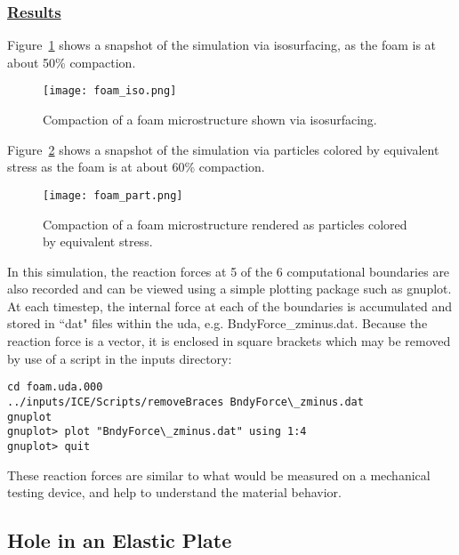 \subsubsection*{\underline{Results}}

Figure~\ref{figfoam} shows a snapshot of the simulation via isosurfacing,
as the foam is at about 50\% compaction.
\begin{figure}
  \center
  \texttt{[image: foam\_iso.png]}
  \caption{Compaction of a foam microstructure shown via isosurfacing.}
  \label{figfoam}
\end{figure}

Figure~\ref{figfoampart} shows a snapshot of the simulation via particles
colored by equivalent stress as the foam is at about 60\% compaction.
\begin{figure}
  \center
  \texttt{[image: foam\_part.png]}
  \caption{Compaction of a foam microstructure rendered as particles colored
           by equivalent stress.}
  \label{figfoampart}
\end{figure}

In this simulation, the reaction forces at 5 of the 6 computational boundaries
are also recorded and can be viewed using a simple plotting package such
as gnuplot.  At each timestep, the internal force at each of the boundaries
is accumulated and stored in ``dat" files within the uda,
e.g. BndyForce\_zminus.dat.  Because the reaction force is a vector, it
is enclosed in square brackets which may be removed by use of a script in
the inputs directory:

\begin{Verbatim}[fontsize=\footnotesize]
cd foam.uda.000
../inputs/ICE/Scripts/removeBraces BndyForce\_zminus.dat
gnuplot
gnuplot> plot "BndyForce\_zminus.dat" using 1:4
gnuplot> quit
\end{Verbatim}

These reaction forces are similar to what would be measured on a mechanical
testing device, and help to understand the material behavior.

\subsection*{\center Hole in an Elastic Plate}
